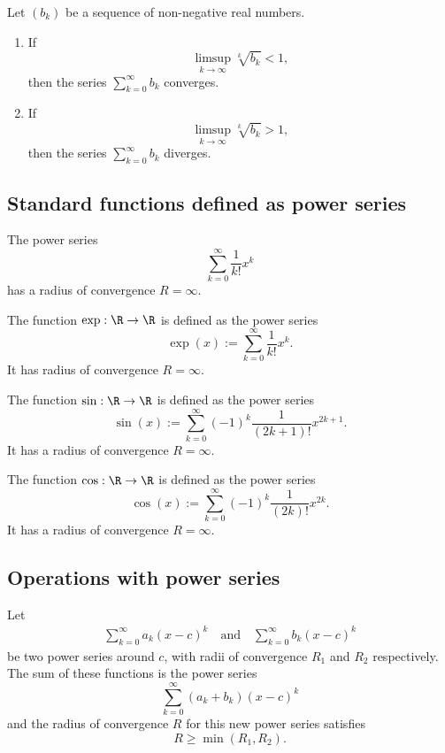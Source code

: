 \begin{theorem}
    Let $(b_k)$ be a sequence of non-negative real numbers.
    \begin{enumerate}
        \item If
            $$\limsup_{k \to \infty}\sqrt[k]{b_k} < 1,$$
            then the series $\sum_{k=0}^\infty b_k$ converges.
        \item If
            $$\limsup_{k \to \infty}\sqrt[k]{b_k} > 1,$$
            then the series $\sum_{k=0}^\infty b_k$ diverges.
    \end{enumerate}
\end{theorem}

\subsection{Standard functions defined as power series}

\begin{proposition}
    The power series
    $$\sum_{k=0}^\infty \frac{1}{k!}x^k$$
    has a radius of convergence $R = \infty$.
\end{proposition}

\begin{definition}
    The function $\exp: \R \to \R$ is defined as the power series
    $$\exp(x) := \sum_{k=0}^\infty\frac{1}{k!}x^k.$$
    It has radius of convergence $R = \infty$.
\end{definition}

\begin{definition}
    The function $\sin: \R \to \R$ is defined as the power series
    $$\sin(x):=\sum_{k=0}^\infty(-1)^k\frac{1}{(2k+1)!}x^{2k+1}.$$
    It has a radius of convergence $R = \infty$.
\end{definition}

\begin{definition}
    The function $\cos: \R \to \R$ is defined as the power series
    $$\cos(x):=\sum_{k=0}^\infty(-1)^k\frac{1}{(2k)!}x^{2k}.$$
    It has a radius of convergence $R = \infty$.
\end{definition}

\subsection{Operations with power series}

\begin{proposition}
    Let
    \begin{align*}
        \sum_{k=0}^\infty a_k(x-c)^k\quad \text{and} \quad \sum_{k=0}^\infty b_k(x-c)^k
    \end{align*}
    be two power series around $c$, with radii of convergence $R_1$ and $R_2$
    respectively. The sum of these functions is the power series
    $$\sum_{k=0}^\infty(a_k+b_k)(x-c)^k$$
    and the radius of convergence $R$ for this new power series satisfies
    $$R \ge \min(R_1,R_2).$$
\end{proposition}

